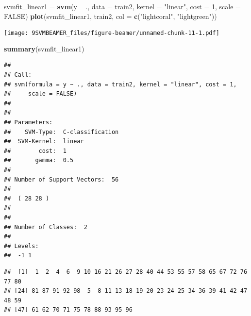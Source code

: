 \documentclass[ignorenonframetext,]{beamer}
\newenvironment{Shaded}{\begin{snugshade}}{\end{snugshade}}
\newcommand{\KeywordTok}[1]{\textcolor[rgb]{0.13,0.29,0.53}{\textbf{#1}}}
\newcommand{\DataTypeTok}[1]{\textcolor[rgb]{0.13,0.29,0.53}{#1}}
\newcommand{\DecValTok}[1]{\textcolor[rgb]{0.00,0.00,0.81}{#1}}
\newcommand{\StringTok}[1]{\textcolor[rgb]{0.31,0.60,0.02}{#1}}
\newcommand{\CommentTok}[1]{\textcolor[rgb]{0.56,0.35,0.01}{\textit{#1}}}
\newcommand{\OtherTok}[1]{\textcolor[rgb]{0.56,0.35,0.01}{#1}}
\newcommand{\OperatorTok}[1]{\textcolor[rgb]{0.81,0.36,0.00}{\textbf{#1}}}
\newcommand{\NormalTok}[1]{#1}
\begin{document}
\begin{frame}[fragile]

\footnotesize

\begin{Shaded}
\begin{Highlighting}[]
\NormalTok{svmfit_linear1 =}\StringTok{ }\KeywordTok{svm}\NormalTok{(y }\OperatorTok{~}\StringTok{ }\NormalTok{., }\DataTypeTok{data =}\NormalTok{ train2, }\DataTypeTok{kernel =} \StringTok{"linear"}\NormalTok{, }\DataTypeTok{cost =} \DecValTok{1}\NormalTok{, }
    \DataTypeTok{scale =} \OtherTok{FALSE}\NormalTok{)}
\KeywordTok{plot}\NormalTok{(svmfit_linear1, train2, }\DataTypeTok{col =} \KeywordTok{c}\NormalTok{(}\StringTok{"lightcoral"}\NormalTok{, }\StringTok{"lightgreen"}\NormalTok{))}
\end{Highlighting}
\end{Shaded}

\texttt{[image: 9SVMBEAMER\_files/figure-beamer/unnamed-chunk-11-1.pdf]}

\begin{Shaded}
\begin{Highlighting}[]
\KeywordTok{summary}\NormalTok{(svmfit_linear1)}
\end{Highlighting}
\end{Shaded}

\begin{verbatim}
## 
## Call:
## svm(formula = y ~ ., data = train2, kernel = "linear", cost = 1, 
##     scale = FALSE)
## 
## 
## Parameters:
##    SVM-Type:  C-classification 
##  SVM-Kernel:  linear 
##        cost:  1 
##       gamma:  0.5 
## 
## Number of Support Vectors:  56
## 
##  ( 28 28 )
## 
## 
## Number of Classes:  2 
## 
## Levels: 
##  -1 1
\end{verbatim}

\begin{Shaded}
\end{Shaded}

\begin{verbatim}
##  [1]  1  2  4  6  9 10 16 21 26 27 28 40 44 53 55 57 58 65 67 72 76 77 80
## [24] 81 87 91 92 98  5  8 11 13 18 19 20 23 24 25 34 36 39 41 42 47 48 59
## [47] 61 62 70 71 75 78 88 93 95 96
\end{verbatim}

\normalsize

\end{frame}
\end{document}
